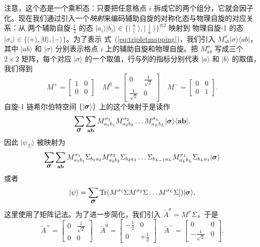 \documentclass[a4paper,10pt,oneside,onecolumn,1p,times]{elsarticle}
\newcommand{\tr}{{\rm Tr }}
\newcommand{\bra}[1]{\mbox{$\langle #1  |$}}
\newcommand{\ket}[1]{\mbox{$| #1  \rangle$}}
\newcommand{\fat}[1]{\mbox{\boldmath$#1$\unboldmath}}	%
\newcommand{\syslength}{L}
\newcommand{\Eq}[1]{式~(\ref{#1})}
\begin{document}
注意，这个态是一个乘积态：只要把任意格点 $i$ 拆成它的两个组分，它就会因子化。现在我们通过引入一个{\em 映射}来编码辅助自旋的对称化态与物理自旋的对应关系：从
两个辅助自旋-$\frac{1}{2}$ 的态 $\ket{a_i}\ket{b_i} \in \{
\ket{\uparrow},\ket{\downarrow}\}^{\otimes 2}$ 映射到
物理自旋-1 的态 $\ket{\sigma_i} \in \{ \ket{+},\ket{0},\ket{-} \}$。为了表示 \Eq{eq:tripletmapping}，我们引入 $M_{ab}^{\sigma}
\ket{\sigma} \bra{ab}$，其中 $\ket{ab}$ 和 $\ket{\sigma}$ 分别表示格点 $i$ 上的辅助自旋和物理自旋。把 $M_{ab}^{\sigma}$ 写成三个 $2\times 2$ 矩阵，每个对应 $\ket{\sigma}$ 的一个取值，行与列的指标分别代表 $\ket{a}$ 和 $\ket{b}$ 的取值，我们得到
\begin{equation}
    M^+ = \left[ \begin{array}{cc} 1 & 0 \\ 0 & 0 \end{array} \right] \quad
    M^0 = \left[ \begin{array}{cc} 0 & \frac{1}{\sqrt{2}} \\ 
    \frac{1}{\sqrt{2}} & 0 \end{array} \right] \quad
    M^- = \left[ \begin{array}{cc} 0 & 0 \\ 0 & 1 \end{array} \right] .
\end{equation}
自旋-1 链希尔伯特空间 $\{ \ket{\fat{\sigma}} \}$ 上的这个映射于是读作
\begin{equation} 
\sum_{\fat{\sigma}} \sum_{{\bf a}{\bf b}} M^{\sigma_1}_{a_1 b_1} M^{\sigma_2}_{a_2 b_2} \ldots M^{\sigma_\syslength}_{a_\syslength b_\syslength}
\ket{\fat{\sigma}} \bra{{\bf a}{\bf b}} .
\end{equation}
因此 $\ket{\psi_\Sigma}$ 被映射为
\begin{equation}
\sum_{\fat{\sigma}} \sum_{{\bf a}{\bf b}} M^{\sigma_1}_{a_1 b_1} \Sigma_{b_1 a_2}
M^{\sigma_2}_{a_2 b_2} \Sigma_{b_2 a_3} \ldots \Sigma_{b_{\syslength-1} a_\syslength} 
M^{\sigma_\syslength}_{a_\syslength b_\syslength} \Sigma_{b_\syslength a_1} 
\ket{\fat{\sigma}}
\end{equation}
或者
\begin{equation}
    \ket{\psi} = \sum_{\fat{\sigma}} \tr (M^{\sigma_{1}} \Sigma
    M^{\sigma_{2}} \Sigma \ldots M^{\sigma_{\syslength}} \Sigma] ) \ket{\fat{\sigma}} ,
\end{equation}
这里使用了矩阵记法。为了进一步简化，我们引入 $\tilde{A}^\sigma= M^\sigma \Sigma$，于是
\begin{equation}
    \tilde{A}^+ = \left[ \begin{array}{cc} 0 & \frac{1}{\sqrt{2}} \\ 0 & 0 \end{array} \right] \quad
    \tilde{A}^0 = \left[ \begin{array}{cc} -\frac{1}{2} & 0 \\ 
    0 & +\frac{1}{2} \end{array} \right] \quad
    \tilde{A}^- = \left[ \begin{array}{cc} 0 & 0 \\ -\frac{1}{\sqrt{2}} & 0 \end{array} \right] .
    \label{eq:unnormalizeda}
\end{equation}
\end{document}
